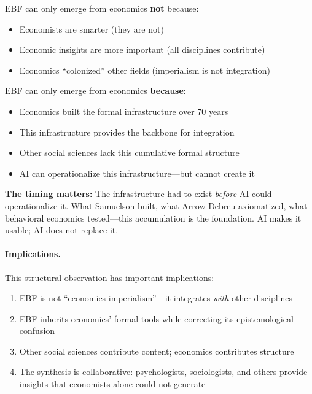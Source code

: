 \begin{tcolorbox}[colback=blue!5!white, colframe=blue!75!black,
    title=\textbf{The Infrastructure Thesis}]

EBF can only emerge from economics \textbf{not} because:
\begin{itemize}[nosep]
    \item Economists are smarter (they are not)
    \item Economic insights are more important (all disciplines contribute)
    \item Economics ``colonized'' other fields (imperialism is not integration)
\end{itemize}

EBF can only emerge from economics \textbf{because}:
\begin{itemize}[nosep]
    \item Economics built the formal infrastructure over 70 years
    \item This infrastructure provides the backbone for integration
    \item Other social sciences lack this cumulative formal structure
    \item AI can operationalize this infrastructure---but cannot create it
\end{itemize}

\textbf{The timing matters:} The infrastructure had to exist \emph{before} AI could
operationalize it. What Samuelson built, what Arrow-Debreu axiomatized, what behavioral
economics tested---this accumulation is the foundation. AI makes it usable; AI does not
replace it.
\end{tcolorbox}

\paragraph{Implications.}
This structural observation has important implications:
\begin{enumerate}[nosep]
    \item EBF is not ``economics imperialism''---it integrates \emph{with} other disciplines
    \item EBF inherits economics' formal tools while correcting its epistemological confusion
    \item Other social sciences contribute content; economics contributes structure
    \item The synthesis is collaborative: psychologists, sociologists, and others provide
        insights that economists alone could not generate
\end{enumerate}


